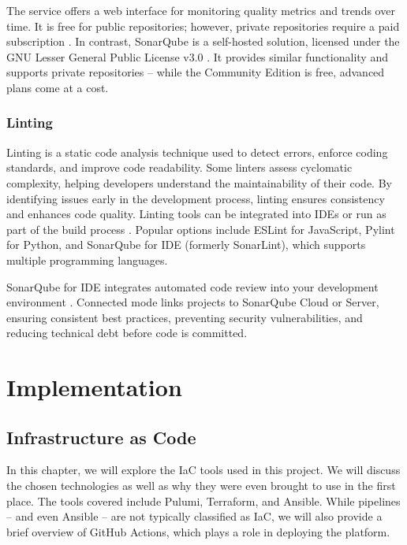 The service offers a web interface for monitoring quality metrics and trends over time. It is free for public repositories; however, private repositories require a paid subscription \Parencite{SonarCloudPricing2025}. In contrast, SonarQube is a self-hosted solution, licensed under the GNU Lesser General Public License v3.0 \Parencite{SonarQubeLicense2025}. It provides similar functionality and supports private repositories -- while the Community Edition is free, advanced plans come at a cost.

\subsection{Linting}
Linting is a static code analysis technique used to detect errors, enforce coding standards, and improve code readability. Some linters assess cyclomatic complexity, helping developers understand the maintainability of their code. By identifying issues early in the development process, linting ensures consistency and enhances code quality. Linting tools can be integrated into IDEs or run as part of the build process \Parencite{SuperLinter2025}. Popular options include ESLint for JavaScript, Pylint for Python, and SonarQube for IDE (formerly SonarLint), which supports multiple programming languages.

SonarQube for IDE integrates automated code review into your development environment \Parencite{SonarQubeConnectedMode2025}. Connected mode links projects to SonarQube Cloud or Server, ensuring consistent best practices, preventing security vulnerabilities, and reducing technical debt before code is committed.

\chapter{Implementation}\label{chap:implementation}

\section{Infrastructure as Code}

In this chapter, we will explore the IaC tools used in this project. We will discuss the chosen technologies as well as why they were even brought to use in the first place. The tools covered include Pulumi, Terraform, and Ansible. While pipelines -- and even Ansible -- are not typically classified as IaC, we will also provide a brief overview of GitHub Actions, which plays a role in deploying the platform.

